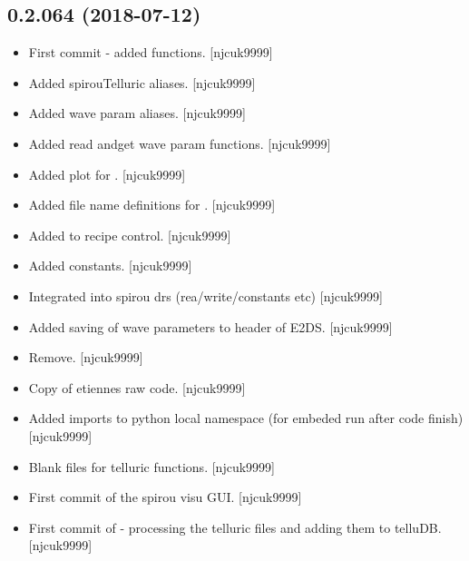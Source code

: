 \documentclass[a4paper,10pt,english]{report}
\begin{document}
\subsection{0.2.064 (2018-07-12)}
\label{\detokenize{misc/changelog:id395}}\begin{itemize}
\item {} 
First commit - added  functions. {[}njcuk9999{]}

\item {} 
Added spirouTelluric aliases. {[}njcuk9999{]}

\item {} 
Added wave param aliases. {[}njcuk9999{]}

\item {} 
Added read andget wave param functions. {[}njcuk9999{]}

\item {} 
Added plot for . {[}njcuk9999{]}

\item {} 
Added file name definitions for . {[}njcuk9999{]}

\item {} 
Added  to recipe control. {[}njcuk9999{]}

\item {} 
Added  constants. {[}njcuk9999{]}

\item {} 
Integrated  into spirou drs (rea/write/constants etc)
{[}njcuk9999{]}

\item {} 
Added saving of wave parameters to header of E2DS. {[}njcuk9999{]}

\item {} 
Remove. {[}njcuk9999{]}

\item {} 
Copy of etiennes raw  code. {[}njcuk9999{]}

\item {} 
Added imports to python local namespace (for embeded run after code
finish) {[}njcuk9999{]}

\item {} 
Blank files for telluric functions. {[}njcuk9999{]}

\item {} 
First commit of the spirou visu GUI. {[}njcuk9999{]}

\item {} 
First commit of  - processing the telluric files and
adding them to telluDB. {[}njcuk9999{]}

\end{itemize}
\end{document}
